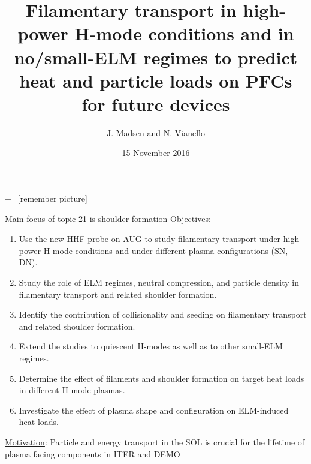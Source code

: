 \documentclass[10pt, compress, draft]{beamer}
\title{Filamentary transport in high-power H-mode conditions and in
  no/small-ELM regimes to predict heat and particle loads on PFCs for
  future devices}
\date{15 November 2016}
\author[Topic 21. J. Madsen and N.Vianello]{J. Madsen and N. Vianello}
\begin{document}
+=[remember picture]
\maketitle

\begin{frame}{Main focus of topic 21 is shoulder formation}
\vspace{-1cm}
Objectives:
\begin{enumerate}
\item Use the new HHF probe on AUG to study filamentary transport under
high-power H-mode conditions and under different plasma configurations (SN,
DN).
\item Study the role of ELM regimes, neutral compression, and particle density in
filamentary transport and related shoulder formation.
\item Identify the contribution of collisionality and seeding on filamentary transport
and related shoulder formation.
\item Extend the studies to quiescent H-modes as well as to other small-ELM regimes.
\item Determine the effect of filaments and shoulder formation on target heat loads
in different H-mode plasmas.
\item Investigate the effect of plasma shape and configuration on ELM-induced heat
loads.
\end{enumerate}
\underline{Motivation}: Particle and energy transport in the SOL is crucial for the lifetime of plasma facing components in ITER and DEMO
\end{frame}
\end{document}
